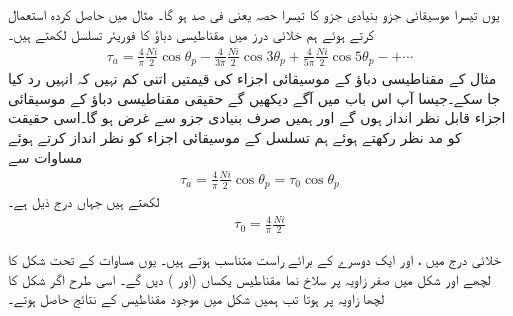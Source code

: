 یوں تیسرا موسیقائی جزو بنیادی جزو کا تیسرا حصہ یعنی  فی صد ہو گا۔
%
مثال  میں حاصل کردہ   استعمال کرتے ہوئے  ہم خلائی درز میں مقناطیسی دباؤ  کا فوریئر تسلسل لکھتے ہیں۔
\begin{align}\label{مساوات_تبادلہ_توانائی_فوریئر_متقناطیسی_دباو_تسلسل}
\tau_a=\frac{4}{\pi}\frac{Ni}{2} \cos \theta_p-\frac{4}{3\pi}\frac{Ni}{2} \cos 3\theta_p+\frac{4}{5\pi}\frac{Ni}{2} \cos 5\theta_p-+\cdots
\end{align}
مثال  کے مقناطیسی دباؤ کے موسیقائی اجزاء  کی قیمتیں اتنی کم نہیں کہ انہیں رد کیا جا سکے۔جیسا آپ اس باب میں آگے دیکھیں گے حقیقی  مقناطیسی دباؤ کے موسیقائی اجزاء قابل نظر انداز ہوں گے اور ہمیں صرف بنیادی جزو  سے غرض ہو گا۔اسی حقیقت کو مد نظر رکھتے ہوئے ہم  تسلسل کے موسیقائی اجزاء کو نظر انداز کرتے ہوئے  مساوات  سے
\begin{align}\label{مساوات_گھومتے_مشین_پھیلا_سائن_نما}
\tau_{a}=\frac{4}{\pi}\frac{Ni}{2} \cos \theta_p=\tau_0 \cos \theta_p
\end{align}
لکھتے ہیں جہاں  درج ذیل ہے۔
\begin{align}\label{مساوات_گھومتے_مشین_دباو_چوٹی}
\tau_0=\frac{4}{\pi}\frac{Ni}{2} 
\end{align}

خلائی درج میں ،  اور  ایک دوسرے کے برائے راست متناسب ہوتے ہیں۔ یوں 
مساوات  کے تحت  شکل   کا لچھے اور  شکل   میں  صفر زاویہ پر سلاخ نما مقناطیس یکساں  (اور ) دیں گے۔ اسی طرح اگر شکل   کا لچھا  زاویہ   پر  ہوتا تب ہمیں  شکل   میں موجود مقناطیس کے نتائج حاصل ہوتے۔

